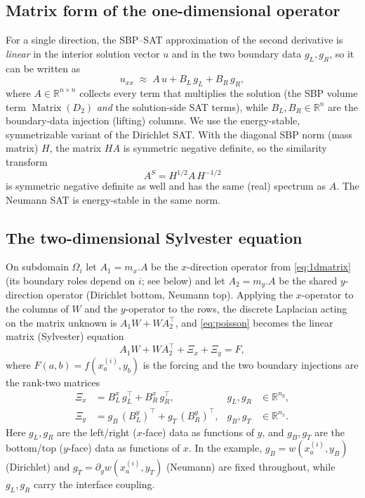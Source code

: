 \documentclass[hidelinks,onefignum,onetabnum]{siamart250211}
\newcommand{\R}{\mathbb{R}}
\newcommand{\Aone}{A_1}
\newcommand{\Atwo}{A_2}
\begin{document}
\subsection{Matrix form of the one-dimensional operator}
For a single direction, the SBP--SAT approximation of the second derivative is
\emph{linear} in the interior solution vector $u$ and in the two boundary data
$g_L, g_R$, so it can be written as
\begin{equation}
\label{eq:1dmatrix}
u_{xx} \;\approx\; A\,u + B_L\, g_L + B_R\, g_R ,
\end{equation}
where $A\in\R^{n\times n}$ collects every term that multiplies the solution
(the SBP volume term $\operatorname{Matrix}(D_2)$ \emph{and} the solution-side
SAT terms), while $B_L, B_R \in \R^{n}$ are the boundary-data injection
(lifting) columns.  We use the energy-stable, symmetrizable variant of the
Dirichlet SAT.  With the diagonal SBP norm (mass matrix) $H$, the matrix $HA$
is symmetric negative definite, so the similarity transform
\begin{equation}
\label{eq:symm1d}
A^{S} = H^{1/2} A\, H^{-1/2}
\end{equation}
is symmetric negative definite as well and has the same (real) spectrum as $A$.
The Neumann SAT is energy-stable in the same norm.

\subsection{The two-dimensional Sylvester equation}
\label{sec:sylvester}
On subdomain $\Omega_i$ let $\Aone = m_x.A$ be the $x$-direction operator from
\cref{eq:1dmatrix} (its boundary roles depend on $i$; see below) and let
$\Atwo = m_y.A$ be the shared $y$-direction operator (Dirichlet bottom, Neumann
top).  Applying the $x$-operator to the columns of $W$ and the $y$-operator to
the rows, the discrete Laplacian acting on the matrix unknown is
$\Aone W + W \Atwo^{\!\top}$, and \cref{eq:poisson} becomes the linear matrix
(Sylvester) equation
\begin{equation}
\label{eq:sylv}
\Aone W + W \Atwo^{\!\top} + \Xi_x + \Xi_y = F,
\end{equation}
where $F(a,b)=f(x^{(i)}_a,y_b)$ is the forcing and the two boundary injections
are the rank-two matrices
\begin{align}
\label{eq:xinj}
\Xi_x &= B_L^{x}\, g_L^{\!\top} + B_R^{x}\, g_R^{\!\top}, & g_L,g_R&\in\R^{n_y},\\
\label{eq:yinj}
\Xi_y &= g_B\, (B_L^{y})^{\!\top} + g_T\, (B_R^{y})^{\!\top}, & g_B,g_T&\in\R^{n_x}.
\end{align}
Here $g_L,g_R$ are the left/right ($x$-face) data as functions of $y$, and
$g_B,g_T$ are the bottom/top ($y$-face) data as functions of $x$.  In the
example, $g_B = w(x^{(i)}_a,y_B)$ (Dirichlet) and
$g_T = \partial_y w(x^{(i)}_a,y_T)$ (Neumann) are fixed throughout, while
$g_L,g_R$ carry the interface coupling.
\end{document}
